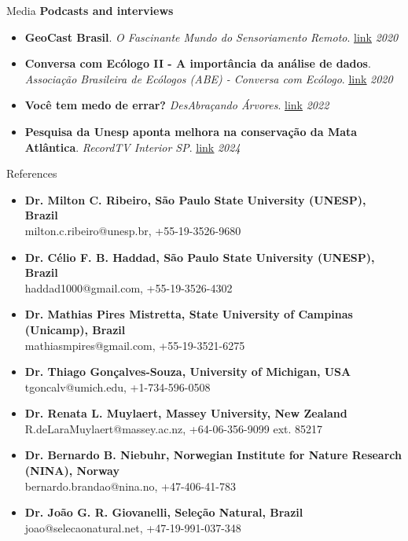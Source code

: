 \documentclass{resume}
\begin{document}
\begin{rSection}{Media}
{\bf Podcasts and interviews}
\begin{itemize} 
\item {\bf GeoCast Brasil}. {\it O Fascinante Mundo do Sensoriamento Remoto}. \href{https://open.spotify.com/episode/0Kn5k9039vM8bZgb4YdlJJ?si=S5hfhNc6S6GfDFaJSsaQDA}{\underline{link}} \hfill{\em 2020}
\item {\bf Conversa com Ecólogo II - A importância da análise de dados}. {\it Associação Brasileira de Ecólogos (ABE) - Conversa com Ecólogo}. \href{https://www.instagram.com/p/CFQVjMtH6qk/}{\underline{link}} \hfill{\em 2020}
\item {\bf Você tem medo de errar?} {\it DesAbraçando Árvores}. \href{https://www.desabrace.com.br/092-voce-tem-medo-de-errar/}{\underline{link}} \hfill{\em 2022} 
\item {\bf Pesquisa da Unesp aponta melhora na conservação da Mata Atlântica}. {\it RecordTV Interior SP}. \href{https://recordtv.r7.com/recordtv-interior-sp/sp-record/pesquisa-da-unesp-aponta-melhora-na-conservacao-da-mata-atlantica-27032024?utm_source=link_direto&utm_medium=share-bar&utm_campaign=r7-topo}{\underline{link}} \hfill{\em 2024}
\end{itemize} 
\end{rSection}


\begin{rSection}{References}
\begin{itemize}
\item {\bf Dr. Milton C. Ribeiro, São Paulo State University (UNESP), Brazil}\\
milton.c.ribeiro@unesp.br, +55-19-3526-9680
\item {\bf Dr. Célio F. B. Haddad, São Paulo State University (UNESP), Brazil}\\
haddad1000@gmail.com, +55-19-3526-4302
\item {\bf Dr. Mathias Pires Mistretta, State University of Campinas (Unicamp), Brazil}\\
mathiasmpires@gmail.com, +55-19-3521-6275
\item {\bf Dr. Thiago Gonçalves-Souza, University of Michigan, USA}\\
tgoncalv@umich.edu, +1-734-596-0508
\item {\bf Dr. Renata L. Muylaert, Massey University, New Zealand}\\
R.deLaraMuylaert@massey.ac.nz, +64-06-356-9099 ext. 85217
\item {\bf Dr. Bernardo B. Niebuhr, Norwegian Institute for Nature Research (NINA), Norway}\\
bernardo.brandao@nina.no, +47-406-41-783
\item {\bf Dr. João G. R. Giovanelli, Seleção Natural, Brazil}\\
joao@selecaonatural.net, +47-19-991-037-348
\end{itemize}
\end{rSection}
\end{document}
